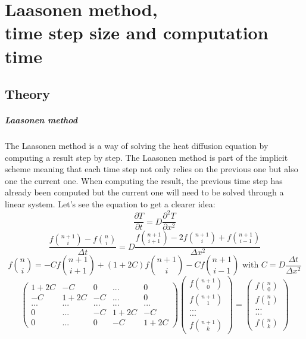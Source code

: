 \documentclass[12pt, a4paper]{report}
\begin{document}
\chapter{Laasonen method,\\ time step size and computation time}

\section{Theory}
\paragraph{Laasonen method}
The Laasonen method is a way of solving the heat diffusion equation by computing a result step by step. The Laasonen method is part of the implicit scheme meaning that each time step not only relies on the previous one but also one the current one. When computing the result, the previous time step has already been computed but the current one will need to be solved through a linear system. Let's see the equation to get a clearer idea:
\begin{equation}\frac{\partial T}{\partial t} = D\frac{\partial^2T }{\partial x^2}
\end{equation} 
\begin{equation}\frac{f\binom{n+1}{i} - f\binom{n}{i}}{\Delta t} = D\frac{f\binom{n+1}{i+1} - 2f\binom{n+1}{i}+ f\binom{n+1}{i-1}}{\Delta x^{2}}
\end{equation} 
\begin{equation}f\binom{n}{i} = -Cf\binom{n+1}{i+1}+(1+2C)f\binom{n+1}{i}-Cf\binom{n+1}{i-1}
   \text{ with }
C = D\frac{\Delta t}{\Delta x^{2}}
\end{equation}
\begin{equation}
\begin{pmatrix}
1+2C & -C & 0 & ... & 0\\
-C & 1+2C & -C& ... & 0\\
...&...&...&...&...\\
 0 & ...& -C &1+2C & -C \\
0 & ... &  0& -C & 1+2C
\end{pmatrix}
\begin{pmatrix}
f\binom{n+1}{0}\\
f\binom{n+1}{1}\\
...\\
...\\
f\binom{n+1}{k}
\end{pmatrix}
=
\begin{pmatrix}
f\binom{n}{0}\\
f\binom{n}{1}\\
...\\
...\\
f\binom{n}{k}
\end{pmatrix}
\end{equation}
\end{document}
